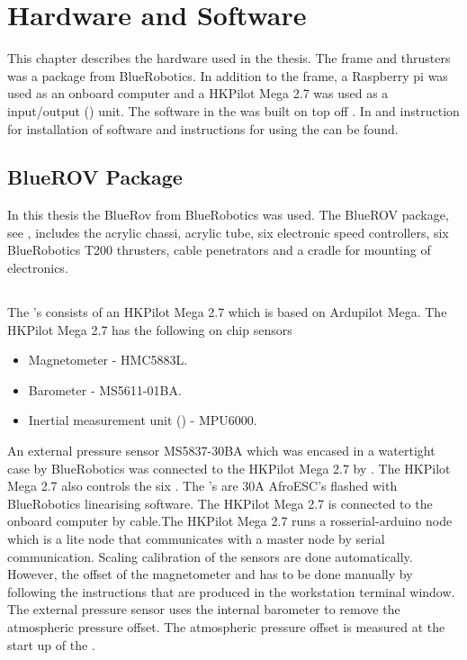 \chapter{Hardware and Software}\label{cha:hardware}
This chapter describes the hardware used in the thesis. The \abbrROV frame and thrusters was a package from BlueRobotics. In addition to the \abbrROV frame, a Raspberry pi was used as an onboard computer and a HKPilot Mega 2.7  was used as a input/output (\abbrIO) unit. The software in the \abbrROV was built on top off \abbrROS. In  and  instruction for installation of software and instructions for using the \abbrROV can be found.

\section{BlueROV Package}
In this thesis the BlueRov from BlueRobotics was used. The BlueROV package, see , includes the acrylic chassi, acrylic tube, six electronic speed controllers, six BlueRobotics T200 thrusters, cable penetrators and a cradle for mounting of electronics.
\section{\abbrROV \abbrIO}
The \abbrROV's \abbrIO consists of an HKPilot Mega 2.7 which is based on Ardupilot Mega. The HKPilot Mega 2.7 has the following on chip sensors
\begin{itemize}
    \item Magnetometer - HMC5883L.
    \item Barometer - MS5611-01BA.
    \item Inertial measurement unit (\abbrIMU) - MPU6000.
\end{itemize}
An external pressure sensor MS5837-30BA which was encased in a watertight case by BlueRobotics was connected to the HKPilot Mega 2.7 by \abbrIC.
The HKPilot Mega 2.7 also controls the six \abbrESC. The \abbrESC's are 30A AfroESC's flashed with BlueRobotics linearising software. The HKPilot Mega 2.7 is connected to the onboard computer by \abbrUSB cable.The HKPilot Mega 2.7 runs a rosserial-arduino node which is a lite \abbrROS node that communicates with a master node by serial communication. Scaling calibration of the sensors are done automatically. However, the offset of the magnetometer and \abbrROV has to be done manually by following the instructions that are produced in the workstation terminal window. The external pressure sensor uses the internal barometer to remove the atmospheric pressure offset. The atmospheric pressure offset is measured at the start up of the \abbrROV.

